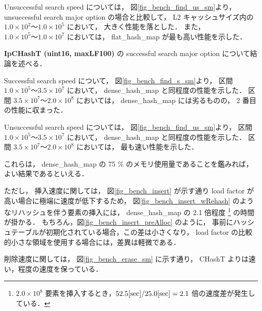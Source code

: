 Unsuccessful search speed については，
図\ref{fig_bench_find_us_sm}より，
unsuccessful search major option の場合と比較して，
L2 キャッシュサイズ内の $1.0\times10^2〜1.0\times10^5$ において，
大きく性能を落とした．
また，$1.0\times10^5〜1.0\times10^7$ においては，
flat\_hash\_map が最も高い性能を示した．
\newline

{\bf IpCHashT (uint16, maxLF100)} の successful search major option について結論を述べる．

Successful search speed について，
図\ref{fig_bench_find_s_sm}より，
区間 $1.0\times10^5〜3.5\times10^7$ において，
dense\_hash\_map と同程度の性能を示した．
区間 $3.5\times10^7〜2.0\times10^8$ においては，
dense\_hash\_map には劣るものの，
2 番目の性能に収まった．

Unsuccessful search speed については，
図\ref{fig_bench_find_us_sm}より，
区間 $1.0\times10^5〜3.5\times10^7$ において，
dense\_hash\_map と同程度の性能を示した．
区間 $3.5\times10^7〜2.0\times10^8$ においては，
最も速い性能を示した．

これらは，
dense\_hash\_map の 75 \% のメモリ使用量であることを鑑みれば，
よい結果であるといえる．

ただし，
挿入速度に関しては，
図\ref{fig_bench_insert} が示す通り load factor が高い場合に極端に速度が低下するため，
図\ref{fig_bench_insert_wRehash} のようなリハッシュを伴う要素の挿入には，
dense\_hash\_map の 2.1 倍程度
\footnote{
  $2.0\times 10^8$ 要素を挿入するとき，$52.5 {\rm[sec]}/ 25.0{\rm[sec]}=2.1$ 倍の速度差が発生している．
}
の時間が掛かる．
もちろん，図\ref{fig_bench_insert_preAlloc} のように，
事前にハッシュテーブルが初期化されている場合，この差は小さくなり，
load factor の比較的小さな領域を使用する場合には，差異は軽微である．

削除速度に関しては，
図\ref{fig_bench_erase_sm} に示す通り，
CHashT よりは速い，程度の速度を保っている．
\newline

